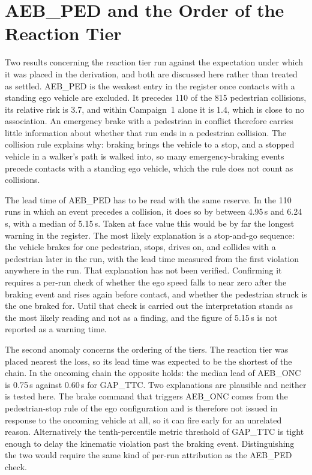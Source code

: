 \section{AEB\_PED and the Order of the Reaction Tier}
\label{sec:disc_aebped}

Two results concerning the reaction tier run against the expectation under which
it was placed in the derivation, and both are discussed here rather than treated
as settled. AEB\_PED is the weakest entry in the register once contacts with a standing ego
vehicle are excluded. It precedes 110 of the 815 pedestrian collisions, its
relative risk is 3.7, and within Campaign~1 alone it is 1.4, which is close to no
association. An emergency brake with a pedestrian in conflict therefore carries
little information about whether that run ends in a pedestrian collision. The
collision rule explains why: braking brings the vehicle to a stop, and a stopped
vehicle in a walker's path is walked into, so many emergency-braking events
precede contacts with a standing ego vehicle, which the rule does not count as
collisions.

The lead time of AEB\_PED has to be read with the same reserve. In the 110 runs
in which an event precedes a collision, it does so by between 4.95\,s and
6.24\,s, with a median of 5.15\,s. Taken at face value this would be by far the
longest warning in the register. The most likely explanation is a stop-and-go
sequence: the vehicle brakes for one pedestrian, stops, drives on, and collides
with a pedestrian later in the run, with the lead time measured from the first
violation anywhere in the run. That explanation has not been verified. Confirming
it requires a per-run check of whether the ego speed falls to near zero after the
braking event and rises again before contact, and whether the pedestrian struck
is the one braked for. Until that check is carried out the interpretation stands
as the most likely reading and not as a finding, and the figure of 5.15\,s is not
reported as a warning time.

The second anomaly concerns the ordering of the tiers. The reaction tier was
placed nearest the loss, so its lead time was expected to be the shortest of the
chain. In the oncoming chain the opposite holds: the median lead of AEB\_ONC is
0.75\,s against 0.60\,s for GAP\_TTC. Two explanations are plausible and neither
is tested here. The brake command that triggers AEB\_ONC comes from the
pedestrian-stop rule of the ego configuration and is therefore not issued in
response to the oncoming vehicle at all, so it can fire early for an unrelated
reason. Alternatively the tenth-percentile metric threshold of GAP\_TTC is tight
enough to delay the kinematic violation past the braking event. Distinguishing
the two would require the same kind of per-run attribution as the AEB\_PED check.

